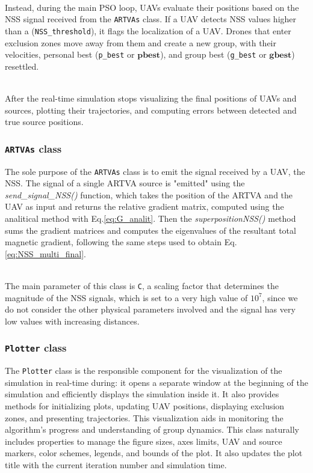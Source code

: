 \documentclass[main]{subfiles}
\begin{document}
\noindent\\
Instead, during the main PSO loop, UAVs evaluate 
their positions based on the NSS signal received from the \texttt{ARTVAs} class. 
If a UAV detects NSS values higher than a (\texttt{NSS\_threshold}),
it flags the localization of a UAV.
Drones that enter exclusion zones move away from them and 
create a new group, with their velocities, 
personal best (\texttt{p\_best} or $\mathbf{pbest}$), and group best 
(\texttt{g\_best} or $\mathbf{gbest}$) resettled.

\noindent\\
After the real-time simulation stops visualizing the final 
positions of UAVs and sources, plotting their trajectories, 
and computing errors between detected and true source positions.

\subsubsection{\texttt{ARTVAs} class}
The sole purpose of the \texttt{ARTVAs} class is to 
emit the signal received by a UAV, the NSS. 
The signal of a single ARTVA source is "emitted" using the \textit{send\_signal\_NSS()} 
function, which takes the position of the ARTVA and the UAV as 
input and returns the relative gradient matrix,
computed using the analitical method with Eq.\ref{eq:G_analit}.
Then the \textit{superpositionNSS()} method sums 
the gradient matrices and computes the eigenvalues of the resultant 
total magnetic gradient,
following the same steps used to obtain Eq.\ref{eq:NSS_multi_final}.

\noindent\\
The main parameter of this class is \texttt{C}, a 
scaling factor that determines the magnitude of the NSS signals, 
which is set to a very high value of $10^7$, since we do not consider
the other physical parameters involved and the signal has very low values
with increasing distances.

\subsubsection{\texttt{Plotter} class}
The \texttt{Plotter} class is the responsible component 
for the visualization of the simulation in real-time during: 
it opens a separate window at the beginning
of the simulation and efficiently displays the simulation inside it.
It also provides methods for initializing plots, updating UAV positions, 
displaying exclusion zones, and presenting trajectories. 
This visualization aids in monitoring the algorithm's 
progress and understanding of group dynamics.
This class naturally includes properties to manage 
the figure sizes, axes limits, UAV and source markers, color schemes, 
legends, and bounds of the plot.
It also updates the plot title with the current iteration 
number and simulation time.
\end{document}
